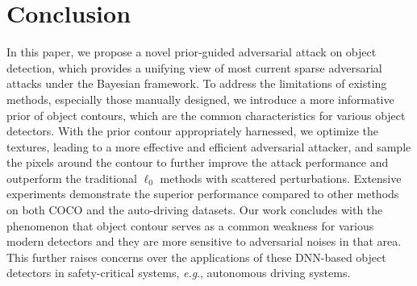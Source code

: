 \documentclass[times,twocolumn,final,authoryear]{elsarticle}
\def\onedot{.\null\xspace}
\def\eg{\emph{e.g}\onedot} \def\Eg{\emph{E.g}\onedot}
\begin{document}
\begin{table}[!t]
\centering
\scriptsize
\caption{Successful Detection Rate (\%, $\downarrow$) with defenses on FRCN. 
}
\label{tab:robust}
\end{table}







\section{Conclusion}

In this paper, we propose a novel prior-guided adversarial attack on object detection, which provides a unifying view of most current sparse adversarial attacks under the Bayesian framework. To address the limitations of existing methods, especially those manually designed, we introduce a more informative prior of object contours, which are the common characteristics for various object detectors. With the prior contour appropriately harnessed, we optimize the textures, leading to a more effective and efficient adversarial attacker, and sample the pixels around the contour to further improve the attack performance and outperform the traditional $\ell_0$ methods with scattered perturbations. Extensive experiments demonstrate the superior performance compared to other methods on both COCO and the auto-driving datasets. Our work concludes with the phenomenon that object contour serves as a common weakness for various modern detectors and they are more sensitive to adversarial noises in that area. This further raises concerns over the applications of these DNN-based object detectors in safety-critical systems, \eg, autonomous driving systems. 
\end{document}
